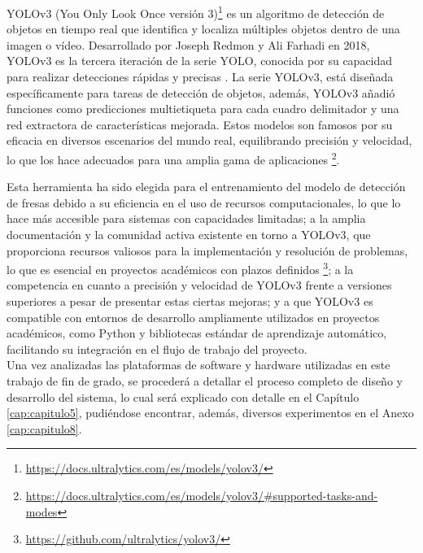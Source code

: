 YOLOv3 (You Only Look Once versión 3)\footnote{\url{https://docs.ultralytics.com/es/models/yolov3/}} es un algoritmo de detección de objetos en tiempo real que identifica y localiza múltiples objetos dentro de una imagen o vídeo. Desarrollado por Joseph Redmon y Ali Farhadi en 2018, YOLOv3 es la tercera iteración de la serie YOLO, conocida por su capacidad para realizar detecciones rápidas y precisas \cite{Redmon18}. %
La serie YOLOv3, está diseñada específicamente para tareas de detección de objetos, además, YOLOv3 añadió funciones como predicciones multietiqueta para cada cuadro delimitador y una red extractora de características mejorada. Estos modelos son famosos por su eficacia en diversos escenarios del mundo real, equilibrando precisión y velocidad, lo que los hace adecuados para una amplia gama de aplicaciones \footnote{\url{https://docs.ultralytics.com/es/models/yolov3/\#supported-tasks-and-modes}}.

Esta herramienta ha sido elegida para el entrenamiento del modelo de detección de fresas debido a su eficiencia en el uso de recursos computacionales, lo que lo hace más accesible para sistemas con capacidades limitadas; a la amplia documentación y la comunidad activa existente en torno a YOLOv3, que proporciona recursos valiosos para la implementación y resolución de problemas, lo que es esencial en proyectos académicos con plazos definidos \footnote{\url{https://github.com/ultralytics/yolov3/}}; a la competencia en cuanto a precisión y velocidad de YOLOv3 frente a versiones superiores a pesar de presentar estas ciertas mejoras; y a que YOLOv3 es compatible con entornos de desarrollo ampliamente utilizados en proyectos académicos, como Python y bibliotecas estándar de aprendizaje automático, facilitando su integración en el flujo de trabajo del proyecto.\\


Una vez analizadas las plataformas de software y hardware utilizadas en este trabajo de fin de grado, se procederá a detallar el proceso completo de diseño y desarrollo del sistema, lo cual será explicado con detalle en el Capítulo \ref{cap:capitulo5}, pudiéndose encontrar, además, diversos experimentos en el Anexo \ref{cap:capitulo8}.






